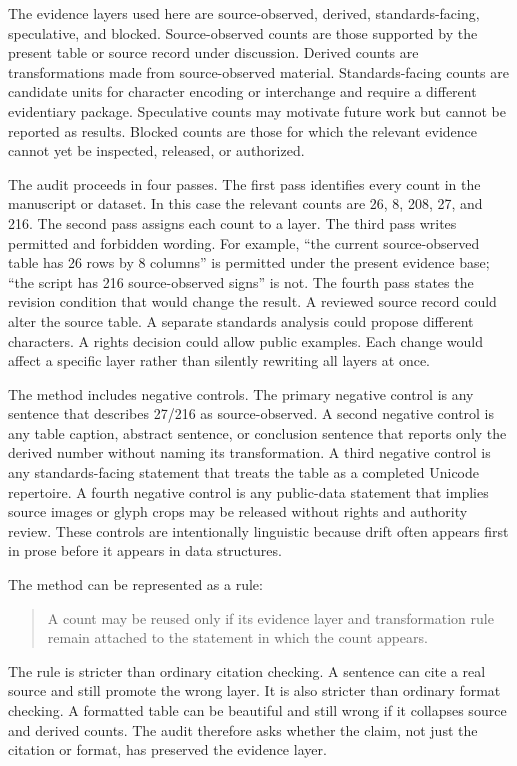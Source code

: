 \documentclass[sigconf,nonacm]{acmart}
\begin{document}
The evidence layers used here are source-observed, derived, standards-facing,
speculative, and blocked. Source-observed counts are those supported by the
present table or source record under discussion. Derived counts are
transformations made from source-observed material. Standards-facing counts are
candidate units for character encoding or interchange and require a different
evidentiary package. Speculative counts may motivate future work but cannot be
reported as results. Blocked counts are those for which the relevant evidence
cannot yet be inspected, released, or authorized.

The audit proceeds in four passes. The first pass identifies every count in the
manuscript or dataset. In this case the relevant counts are 26, 8, 208, 27, and
216. The second pass assigns each count to a layer. The third pass writes
permitted and forbidden wording. For example, ``the current source-observed
table has 26 rows by 8 columns'' is permitted under the present evidence base;
``the script has 216 source-observed signs'' is not. The fourth pass states the
revision condition that would change the result. A reviewed source record could
alter the source table. A separate standards analysis could propose different
characters. A rights decision could allow public examples. Each change would
affect a specific layer rather than silently rewriting all layers at once.

The method includes negative controls. The primary negative control is any
sentence that describes 27/216 as source-observed. A second negative control is
any table caption, abstract sentence, or conclusion sentence that reports only
the derived number without naming its transformation. A third negative control
is any standards-facing statement that treats the table as a completed Unicode
repertoire. A fourth negative control is any public-data statement that implies
source images or glyph crops may be released without rights and authority
review. These controls are intentionally linguistic because drift often appears
first in prose before it appears in data structures.

The method can be represented as a rule:

\begin{quote}
A count may be reused only if its evidence layer and transformation rule remain
attached to the statement in which the count appears.
\end{quote}

The rule is stricter than ordinary citation checking. A sentence can cite a real
source and still promote the wrong layer. It is also stricter than ordinary
format checking. A formatted table can be beautiful and still wrong if it
collapses source and derived counts. The audit therefore asks whether the
claim, not just the citation or format, has preserved the evidence layer.
\end{document}

